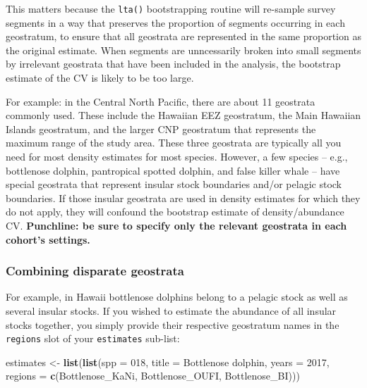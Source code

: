 \documentclass[
]{book}
\newenvironment{Shaded}{\begin{snugshade}}{\end{snugshade}}
\newcommand{\AttributeTok}[1]{\textcolor[rgb]{0.13,0.29,0.53}{#1}}
\newcommand{\DecValTok}[1]{\textcolor[rgb]{0.00,0.00,0.81}{#1}}
\newcommand{\FunctionTok}[1]{\textcolor[rgb]{0.13,0.29,0.53}{\textbf{#1}}}
\newcommand{\NormalTok}[1]{#1}
\newcommand{\OtherTok}[1]{\textcolor[rgb]{0.56,0.35,0.01}{#1}}
\newcommand{\StringTok}[1]{\textcolor[rgb]{0.31,0.60,0.02}{#1}}
\begin{document}
This matters because the \texttt{lta()} bootstrapping routine will re-sample survey segments in a way that preserves the proportion of segments occurring in each geostratum, to ensure that all geostrata are represented in the same proportion as the original estimate. When segments are unncessarily broken into small segments by irrelevant geostrata that have been included in the analysis, the bootstrap estimate of the CV is likely to be too large.

For example: in the Central North Pacific, there are about 11 geostrata commonly used. These include the Hawaiian EEZ geostratum, the Main Hawaiian Islands geostratum, and the larger CNP geostratum that represents the maximum range of the study area. These three geostrata are typically all you need for most density estimates for most species. However, a few species -- e.g., bottlenose dolphin, pantropical spotted dolphin, and false killer whale -- have special geostrata that represent insular stock boundaries and/or pelagic stock boundaries. If those insular geostrata are used in density estimates for which they do not apply, they will confound the bootstrap estimate of density/abundance CV. \textbf{Punchline: be sure to specify only the relevant geostrata in each cohort's settings.}

\hypertarget{combining-disparate-geostrata}{%
\subsubsection*{Combining disparate geostrata}\label{combining-disparate-geostrata}}

For example, in Hawaii bottlenose dolphins belong to a pelagic stock as well as several insular stocks. If you wished to estimate the abundance of all insular stocks together, you simply provide their respective geostratum names in the \texttt{regions} slot of your \texttt{estimates} sub-list:

\begin{Shaded}
\begin{Highlighting}[]
\NormalTok{estimates }\OtherTok{\textless{}{-}} \FunctionTok{list}\NormalTok{(}\FunctionTok{list}\NormalTok{(}\AttributeTok{spp =} \StringTok{\textquotesingle{}018\textquotesingle{}}\NormalTok{,}
                       \AttributeTok{title =} \StringTok{\textquotesingle{}Bottlenose dolphin\textquotesingle{}}\NormalTok{,}
                       \AttributeTok{years =} \DecValTok{2017}\NormalTok{,}
                       \AttributeTok{regions =} \FunctionTok{c}\NormalTok{(}\StringTok{\textquotesingle{}Bottlenose\_KaNi\textquotesingle{}}\NormalTok{,}
                                   \StringTok{\textquotesingle{}Bottlenose\_OUFI\textquotesingle{}}\NormalTok{,}
                                   \StringTok{\textquotesingle{}Bottlenose\_BI\textquotesingle{}}\NormalTok{)))}
\end{Highlighting}
\end{Shaded}
\end{document}
